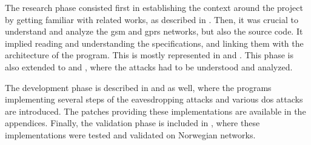     The research phase consisted first in establishing the context
    around the project by getting familiar with related works, as
    described in . Then, it was crucial to
    understand and analyze the \gls{gsm} and \gls{gprs} networks, but
    also the  source code. It implied reading and
    understanding the specifications, and linking them with the
    architecture of the program. This is mostly represented in
     and
    . This phase is also
    extended to  and
    , where the attacks had to be understood and
    analyzed.

    The development phase is described in
     and  as
    well, where the programs implementing several steps of the
    eavesdropping attacks and various \gls{dos} attacks are introduced.
    The patches providing these implementations are available in the
    appendices. Finally, the validation phase is included in
    , where
    these implementations were tested and validated on Norwegian
    networks.

